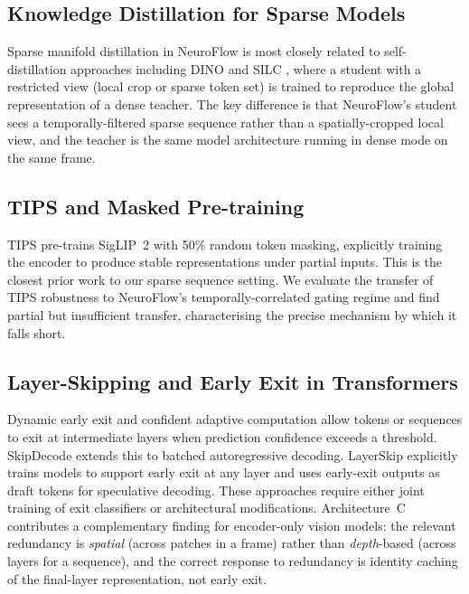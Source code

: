 \documentclass{article}
\begin{document}
\subsection{Knowledge Distillation for Sparse Models}

Sparse manifold distillation in NeuroFlow is most closely related to
self-distillation approaches including DINO \cite{caron2021dino} and
SILC \cite{naeem2023silc}, where a student with a restricted view (local
crop or sparse token set) is trained to reproduce the global representation
of a dense teacher. The key difference is that NeuroFlow's student sees a
temporally-filtered sparse sequence rather than a spatially-cropped local
view, and the teacher is the same model architecture running in dense
mode on the same frame.

\subsection{TIPS and Masked Pre-training}

TIPS \cite{zhai2024siglip2} pre-trains SigLIP~2 with 50\% random token
masking, explicitly training the encoder to produce stable representations
under partial inputs. This is the closest prior work to our sparse sequence
setting. We evaluate the transfer of TIPS robustness to NeuroFlow's
temporally-correlated gating regime and find partial but insufficient
transfer, characterising the precise mechanism by which it falls short.

\subsection{Layer-Skipping and Early Exit in Transformers}
\label{rw:layer-skipping}

Dynamic early exit \cite{teerapittayanon2016branchynet,xin2020deebert}
and confident adaptive computation \cite{schuster2022calm} allow tokens
or sequences to exit at intermediate layers when prediction confidence
exceeds a threshold. SkipDecode \cite{del2023skipdecode} extends this to
batched autoregressive decoding. LayerSkip \cite{elbayad2024layerskip}
explicitly trains models to support early exit at any layer and uses
early-exit outputs as draft tokens for speculative decoding.
These approaches require either joint training of exit classifiers or
architectural modifications. Architecture~C contributes a complementary
finding for encoder-only vision models: the relevant redundancy is
\emph{spatial} (across patches in a frame) rather than
\emph{depth}-based (across layers for a sequence), and the correct
response to redundancy is identity caching of the final-layer
representation, not early exit.
\end{document}
